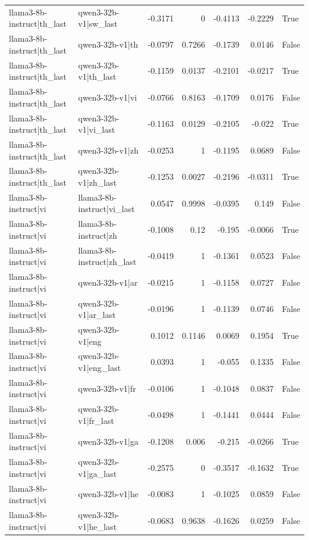 \begin{table}
\begin{tabular}{l l r r r r l}
llama3-8b-instruct|th_last & qwen3-32b-v1|sw_last & -0.3171 & 0 & -0.4113 & -0.2229 & True \\
llama3-8b-instruct|th_last & qwen3-32b-v1|th & -0.0797 & 0.7266 & -0.1739 & 0.0146 & False \\
llama3-8b-instruct|th_last & qwen3-32b-v1|th_last & -0.1159 & 0.0137 & -0.2101 & -0.0217 & True \\
llama3-8b-instruct|th_last & qwen3-32b-v1|vi & -0.0766 & 0.8163 & -0.1709 & 0.0176 & False \\
llama3-8b-instruct|th_last & qwen3-32b-v1|vi_last & -0.1163 & 0.0129 & -0.2105 & -0.022 & True \\
llama3-8b-instruct|th_last & qwen3-32b-v1|zh & -0.0253 & 1 & -0.1195 & 0.0689 & False \\
llama3-8b-instruct|th_last & qwen3-32b-v1|zh_last & -0.1253 & 0.0027 & -0.2196 & -0.0311 & True \\
llama3-8b-instruct|vi & llama3-8b-instruct|vi_last & 0.0547 & 0.9998 & -0.0395 & 0.149 & False \\
llama3-8b-instruct|vi & llama3-8b-instruct|zh & -0.1008 & 0.12 & -0.195 & -0.0066 & True \\
llama3-8b-instruct|vi & llama3-8b-instruct|zh_last & -0.0419 & 1 & -0.1361 & 0.0523 & False \\
llama3-8b-instruct|vi & qwen3-32b-v1|ar & -0.0215 & 1 & -0.1158 & 0.0727 & False \\
llama3-8b-instruct|vi & qwen3-32b-v1|ar_last & -0.0196 & 1 & -0.1139 & 0.0746 & False \\
llama3-8b-instruct|vi & qwen3-32b-v1|eng & 0.1012 & 0.1146 & 0.0069 & 0.1954 & True \\
llama3-8b-instruct|vi & qwen3-32b-v1|eng_last & 0.0393 & 1 & -0.055 & 0.1335 & False \\
llama3-8b-instruct|vi & qwen3-32b-v1|fr & -0.0106 & 1 & -0.1048 & 0.0837 & False \\
llama3-8b-instruct|vi & qwen3-32b-v1|fr_last & -0.0498 & 1 & -0.1441 & 0.0444 & False \\
llama3-8b-instruct|vi & qwen3-32b-v1|ga & -0.1208 & 0.006 & -0.215 & -0.0266 & True \\
llama3-8b-instruct|vi & qwen3-32b-v1|ga_last & -0.2575 & 0 & -0.3517 & -0.1632 & True \\
llama3-8b-instruct|vi & qwen3-32b-v1|he & -0.0083 & 1 & -0.1025 & 0.0859 & False \\
llama3-8b-instruct|vi & qwen3-32b-v1|he_last & -0.0683 & 0.9638 & -0.1626 & 0.0259 & False \\

\end{tabular}
\end{table}
